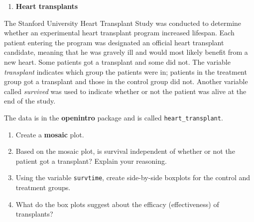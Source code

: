 \documentclass[
]{book}
\providecommand{\tightlist}{%
  \setlength{\itemsep}{0pt}\setlength{\parskip}{0pt}}
\begin{document}
\pagebreak

\begin{enumerate}
\def\labelenumi{\arabic{enumi}.}
\setcounter{enumi}{2}
\tightlist
\item
  \textbf{Heart transplants}
\end{enumerate}

The Stanford University Heart Transplant Study was conducted to determine whether an experimental heart transplant program increased lifespan. Each patient entering the program was designated an official heart transplant candidate, meaning that he was gravely ill and would most likely benefit from a new heart. Some patients got a transplant and some did not. The variable \emph{transplant} indicates which group the patients were in; patients in the treatment group got a transplant and those in the control group did not. Another variable called \emph{survived} was used to indicate whether or not the patient was alive at the end of the study.

The data is in the \textbf{openintro} package and is called \texttt{heart\_transplant}.

\begin{enumerate}
\def\labelenumi{\alph{enumi}.}
\tightlist
\item
  Create a \textbf{mosaic} plot.
\item
  Based on the mosaic plot, is survival independent of whether or not the patient got a transplant? Explain your reasoning.
\item
  Using the variable \texttt{survtime}, create side-by-side boxplots for the control and treatment groups.
\item
  What do the box plots suggest about the efficacy (effectiveness) of transplants?
\end{enumerate}

  
\end{document}
